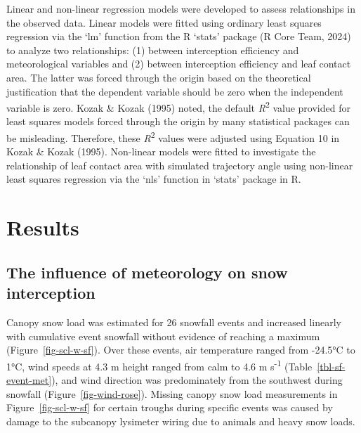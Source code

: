 \documentclass[
  letterpaper,
  DIV=11,
  numbers=noendperiod]{scrartcl}
\begin{document}
Linear and non-linear regression models were developed to assess
relationships in the observed data. Linear models were fitted using
ordinary least squares regression via the `lm' function from the R
`stats' package (R Core Team, 2024) to analyze two relationships: (1)
between interception efficiency and meteorological variables and (2)
between interception efficiency and leaf contact area. The latter was
forced through the origin based on the theoretical justification that
the dependent variable should be zero when the independent variable is
zero. Kozak \& Kozak (1995) noted, the default
\emph{R}\textsuperscript{2} value provided for least squares models
forced through the origin by many statistical packages can be
misleading. Therefore, these \emph{R}\textsuperscript{2} values were
adjusted using Equation 10 in Kozak \& Kozak (1995). Non-linear models
were fitted to investigate the relationship of leaf contact area with
simulated trajectory angle using non-linear least squares regression via
the `nls' function in `stats' package in R.

\section{Results}\label{results}

\subsection{The influence of meteorology on snow
interception}\label{the-influence-of-meteorology-on-snow-interception}

Canopy snow load was estimated for 26 snowfall events and increased
linearly with cumulative event snowfall without evidence of reaching a
maximum (Figure~\ref{fig-scl-w-sf}). Over these events, air temperature
ranged from -24.5°C to 1°C, wind speeds at 4.3 m height ranged from calm
to 4.6 m s\textsuperscript{-1} (Table~\ref{tbl-sf-event-met}), and wind
direction was predominately from the southwest during snowfall
(Figure~\ref{fig-wind-rose}). Missing canopy snow load measurements in
Figure~\ref{fig-scl-w-sf} for certain troughs during specific events was
caused by damage to the subcanopy lysimeter wiring due to animals and
heavy snow loads.
\end{document}
